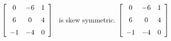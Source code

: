 {$\left[ \begin {array}{ccc} 0&-6&1\\\noalign{\medskip}6&0&4
\\\noalign{\medskip}-1&-4&0\end {array} \right]$} 
{\tta\ is skew symmetric. $\left[ \begin {array}{ccc} 0&-6&1\\\noalign{\medskip}6&0&4\\\noalign{\medskip}-1&-4&0\end {array} \right]
$}



  

